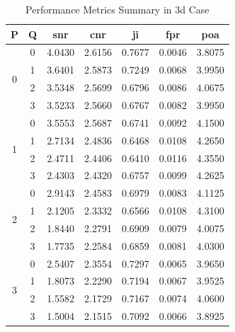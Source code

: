 \begin{table}[htbp!]
\centering
\caption{Performance Metrics Summary in \gls{3d} Case}
\begin{tabular}{ccccccc}
\hline
\textbf{P} & \textbf{Q} & \textbf{\gls{snr}} & \textbf{\gls{cnr}} & \gls{ji} & \gls{fpr} & \gls{poa} \\ \hline
\multirow{4}{*}{0} & 0 & 4.0430 & 2.6156 & 0.7677 & 0.0046 & 3.8075 \\
 & 1 & 3.6401 & 2.5873 & 0.7249 & 0.0068 & 3.9950 \\
 & 2 & 3.5348 & 2.5699 & 0.6796 & 0.0086 & 4.0675 \\
 & 3 & 3.5233 & 2.5660 & 0.6767 & 0.0082 & 3.9950 \\ \hline
\multirow{4}{*}{1} & 0 & 3.5553 & 2.5687 & 0.6741 & 0.0092 & 4.1500 \\
 & 1 & 2.7134 & 2.4836 & 0.6468 & 0.0108 & 4.2650 \\
 & 2 & 2.4711 & 2.4406 & 0.6410 & 0.0116 & 4.3550 \\
 & 3 & 2.4303 & 2.4320 & 0.6757 & 0.0099 & 4.2625 \\ \hline
\multirow{4}{*}{2} & 0 & 2.9143 & 2.4583 & 0.6979 & 0.0083 & 4.1125 \\
 & 1 & 2.1205 & 2.3332 & 0.6566 & 0.0108 & 4.3100 \\
 & 2 & 1.8440 & 2.2791 & 0.6909 & 0.0079 & 4.0075 \\
 & 3 & 1.7735 & 2.2584 & 0.6859 & 0.0081 & 4.0300 \\ \hline
\multirow{4}{*}{3} & 0 & 2.5407 & 2.3554 & 0.7297 & 0.0065 & 3.9650 \\
 & 1 & 1.8073 & 2.2290 & 0.7194 & 0.0067 & 3.9525 \\
 & 2 & 1.5582 & 2.1729 & 0.7167 & 0.0074 & 4.0600 \\
 & 3 & 1.5004 & 2.1515 & 0.7092 & 0.0066 & 3.8925 \\ \hline
\end{tabular}
\label{tab:perfSum3D}
\end{table}

